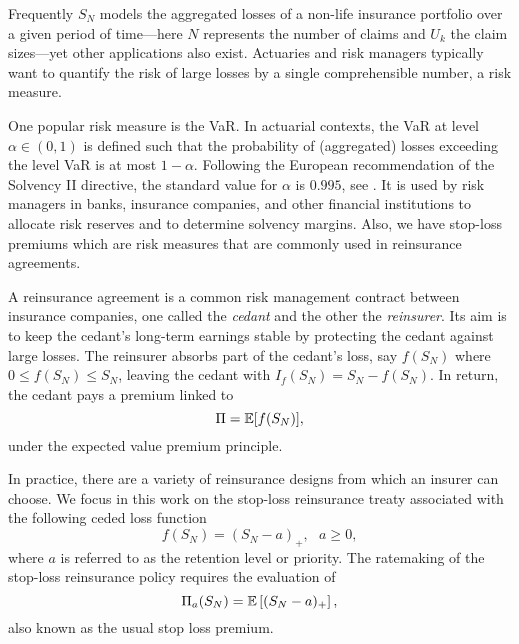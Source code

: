 Frequently $S_N$ models the aggregated losses of a non-life insurance portfolio over a given period of time---here $N$ represents the number of claims and $U_k$ the claim sizes---yet other applications also exist. Actuaries and risk managers typically want to quantify the risk of large losses by a single comprehensible number, a risk measure.

One popular risk measure is the VaR. In actuarial contexts, the VaR at level $\alpha \in (0,1)$ is defined such that the probability of (aggregated) losses exceeding the level VaR is at most $1-\alpha$.
Following the European recommendation of the Solvency II directive, the standard value for $\alpha$ is $0.995$, see \cite{EIOPA}. It is used by risk managers in banks, insurance companies, and other financial institutions to allocate risk reserves and to determine solvency margins. Also, we have stop-loss premiums which are risk measures that are commonly used in reinsurance agreements.

A reinsurance agreement is a common risk management contract between insurance companies, one called the \emph{cedant} and the other the \emph{reinsurer}. Its aim is to keep the cedant's long-term earnings stable by protecting the cedant against large losses. The reinsurer absorbs part of the cedant's loss, say $f(S_N)$ where $0\leq f(S_N)\leq S_N$, leaving the cedant with $I_{f}(S_N)=S_N-f(S_N)$. In return, the cedant pays a premium linked to
\begin{equation*}\label{eq:DefinitionReinsurancePremium}
\Pi=\operatorname{{\mathbb E}}[f(S_N)],
\end{equation*}
under the expected value premium principle.


In practice, there are a variety of reinsurance designs from which an insurer can choose. We focus in this work on the stop-loss reinsurance treaty associated with the following ceded loss function
\begin{equation*}\label{eq:StopLossCededFunction}
f(S_N)=(S_N-a)_{+},\text{ }a\geq0,
\end{equation*}
where $a$ is referred to as the retention level or priority. The ratemaking of the stop-loss reinsurance policy requires the evaluation of
\begin{equation}\label{eq:DefUsualStopLossPremium}
\Pi_{a}(S_N)=\operatorname{{\mathbb E}}\left[(S_N-a)_{+}\right],
\end{equation}
also known as the usual stop loss premium.

